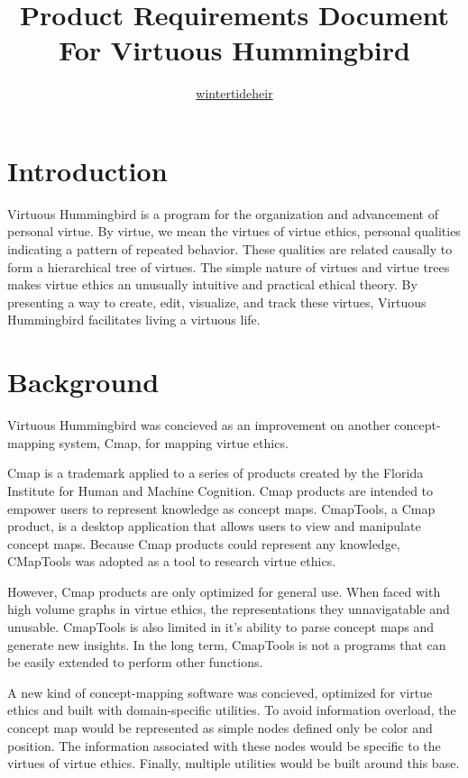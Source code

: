 \documentclass{article}
\title{Product Requirements Document \\ \vspace{1mm} \normalsize For Virtuous Hummingbird}
\author{\href{https://github.com/wintertideheir}{wintertideheir}}
\date{}
\begin{document}
\maketitle
\tableofcontents

\section{Introduction}

Virtuous Hummingbird is a program for the organization and advancement of personal virtue.
By virtue, we mean the virtues of virtue ethics, personal qualities indicating a pattern of repeated behavior.
These qualities are related causally to form a hierarchical tree of virtues. 
The simple nature of virtues and virtue trees makes virtue ethics an unusually intuitive and practical ethical theory.
By presenting a way to create, edit, visualize, and track these virtues, Virtuous Hummingbird facilitates living a virtuous life.

\section{Background}

Virtuous Hummingbird was concieved as an improvement on another concept-mapping system, Cmap, for mapping virtue ethics.

Cmap is a trademark applied to a series of products created by the Florida Institute for Human and Machine Cognition.
Cmap products are intended to empower users to represent knowledge as concept maps.
CmapTools, a Cmap product, is a desktop application that allows users to view and manipulate concept maps.
Because Cmap products could represent any knowledge, CMapTools was adopted as a tool to research virtue ethics.

However, Cmap products are only optimized for general use.
When faced with high volume graphs in virtue ethics, the representations they unnavigatable and unusable.
CmapTools is also limited in it's ability to parse concept maps and generate new insights.
In the long term, CmapTools is not a programs that can be easily extended to perform other functions.

A new kind of concept-mapping software was concieved, optimized for virtue ethics and built with domain-specific utilities.
To avoid information overload, the concept map would be represented as simple nodes defined only be color and position.
The information associated with these nodes would be specific to the virtues of virtue ethics.
Finally, multiple utilities would be built around this base.
\end{document}
